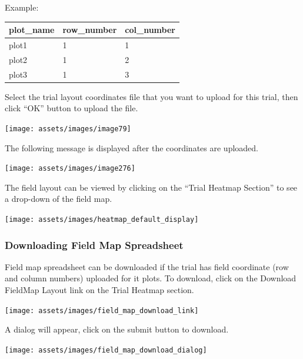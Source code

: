 \documentclass[
  12pt,
]{book}
\begin{document}
Example:

\begin{longtable}[]{@{}lll@{}}
\toprule\noalign{}
plot\_name & row\_number & col\_number \\
\midrule\noalign{}
\endhead
\bottomrule\noalign{}
\endlastfoot
plot1 & 1 & 1 \\
plot2 & 1 & 2 \\
plot3 & 1 & 3 \\
\end{longtable}

Select the trial layout coordinates file that you want to upload for this trial, then click ``OK'' button to upload the file.

\begin{center}\texttt{[image: assets/images/image79]} \end{center}

The following message is displayed after the coordinates are uploaded.

\begin{center}\texttt{[image: assets/images/image276]} \end{center}

The field layout can be viewed by clicking on the ``Trial Heatmap Section'' to see a drop-down of the field map.

\begin{center}\texttt{[image: assets/images/heatmap\_default\_display]} \end{center}

\hypertarget{downloading-field-map-spreadsheet}{%
\subsubsection*{Downloading Field Map Spreadsheet}\label{downloading-field-map-spreadsheet}}


Field map spreadsheet can be downloaded if the trial has field coordinate (row and column numbers) uploaded for it plots. To download, click on the Download FieldMap Layout link on the Trial Heatmap section.

\begin{center}\texttt{[image: assets/images/field\_map\_download\_link]} \end{center}

A dialog will appear, click on the submit button to download.

\begin{center}\texttt{[image: assets/images/field\_map\_download\_dialog]} \end{center}
\end{document}
